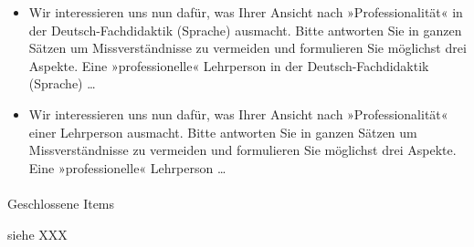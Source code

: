 \documentclass[
  letterpaper,
  DIV=11]{scrartcl}
\makeatletter
\let\oldparagraph\paragraph
\renewcommand{\paragraph}{
    \@ifstar
      \xxxParagraphStar
      \xxxParagraphNoStar
  }
\newcommand{\xxxParagraphStar}[1]{\oldparagraph*{#1}\mbox{}}
\newcommand{\xxxParagraphNoStar}[1]{\oldparagraph{#1}\mbox{}}
\providecommand{\tightlist}{%
  \setlength{\itemsep}{0pt}\setlength{\parskip}{0pt}}\usepackage{longtable,booktabs,array}
\makeatother
\begin{document}
\begin{itemize}
\tightlist
\item
  Wir interessieren uns nun dafür, was Ihrer Ansicht nach
  »Professionalität« in der Deutsch-Fachdidaktik (Sprache) ausmacht.
  Bitte antworten Sie in ganzen Sätzen um Missverständnisse zu vermeiden
  und formulieren Sie möglichst drei Aspekte. Eine »professionelle«
  Lehrperson in der Deutsch-Fachdidaktik (Sprache) \ldots{}
\item
  Wir interessieren uns nun dafür, was Ihrer Ansicht nach
  »Professionalität« einer Lehrperson ausmacht. Bitte antworten Sie in
  ganzen Sätzen um Missverständnisse zu vermeiden und formulieren Sie
  möglichst drei Aspekte. Eine »professionelle« Lehrperson \ldots{}
\end{itemize}

\paragraph{Geschlossene Items}\label{sec-geschlossene-items}

siehe XXX
\end{document}
